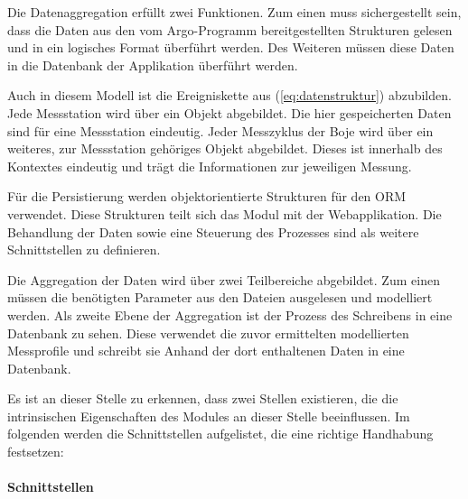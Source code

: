 Die Datenaggregation erfüllt zwei Funktionen. Zum einen muss sichergestellt sein, dass die Daten aus den vom Argo-Programm bereitgestellten Strukturen gelesen und in ein logisches Format überführt werden. Des Weiteren müssen diese Daten in die Datenbank der Applikation überführt werden.

Auch in diesem Modell ist die Ereigniskette aus (\ref{eq:datenstruktur}) abzubilden. Jede Messstation wird über ein Objekt abgebildet. Die hier gespeicherten Daten sind für eine Messstation eindeutig. Jeder Messzyklus der Boje wird über ein weiteres, zur Messstation gehöriges Objekt abgebildet. Dieses ist innerhalb des Kontextes eindeutig und trägt die Informationen zur jeweiligen Messung.

Für die Persistierung  werden objektorientierte Strukturen für den ORM verwendet. Diese Strukturen teilt sich das Modul mit der Webapplikation. Die Behandlung der Daten sowie eine Steuerung des Prozesses sind als weitere Schnittstellen zu definieren.

Die Aggregation der Daten wird über zwei Teilbereiche abgebildet. Zum einen müssen die benötigten Parameter aus den Dateien ausgelesen und modelliert werden.
Als zweite Ebene der Aggregation ist der Prozess des Schreibens in eine Datenbank zu sehen. Diese verwendet die zuvor ermittelten modellierten Messprofile und schreibt sie Anhand der dort enthaltenen Daten in eine Datenbank.


Es ist an dieser Stelle zu erkennen, dass zwei Stellen existieren, die die intrinsischen Eigenschaften des Modules an dieser Stelle beeinflussen. Im folgenden werden die Schnittstellen aufgelistet, die eine richtige Handhabung festsetzen:

\paragraph{Schnittstellen}


